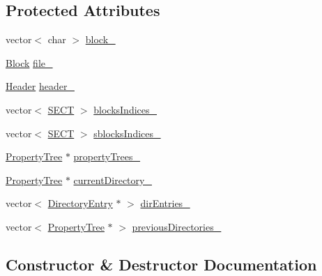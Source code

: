 \subsection*{Protected Attributes}
\begin{DoxyCompactItemize}
\item 
vector$<$ char $>$ \hyperlink{class_y_compound_files_1_1_compound_file_a3ccb0296e57bcafe657ca02f08cdb3d0}{block\+\_\+}
\item 
\hyperlink{class_y_compound_files_1_1_block}{Block} \hyperlink{class_y_compound_files_1_1_compound_file_abd8a8940e9503857dc8e3ab109e9d18b}{file\+\_\+}
\item 
\hyperlink{class_y_compound_files_1_1_compound_file_1_1_header}{Header} \hyperlink{class_y_compound_files_1_1_compound_file_a946c7120aa6ccf47c028620e0f275ef8}{header\+\_\+}
\item 
vector$<$ \hyperlink{_basic_excel_8hpp_a784c2e2144ab372c047faeeb0f6a9e6b}{S\+E\+C\+T} $>$ \hyperlink{class_y_compound_files_1_1_compound_file_aee782bf7c83768a4333fcba419415807}{blocks\+Indices\+\_\+}
\item 
vector$<$ \hyperlink{_basic_excel_8hpp_a784c2e2144ab372c047faeeb0f6a9e6b}{S\+E\+C\+T} $>$ \hyperlink{class_y_compound_files_1_1_compound_file_a772ab9d0acb2963d17f5d33ddb2bc3dc}{sblocks\+Indices\+\_\+}
\item 
\hyperlink{class_y_compound_files_1_1_compound_file_1_1_property_tree}{Property\+Tree} $\ast$ \hyperlink{class_y_compound_files_1_1_compound_file_a79debb22852a2e6b16c94b51d2a00df7}{property\+Trees\+\_\+}
\item 
\hyperlink{class_y_compound_files_1_1_compound_file_1_1_property_tree}{Property\+Tree} $\ast$ \hyperlink{class_y_compound_files_1_1_compound_file_a5f65e3d2af4ef51990e7e61a625c7384}{current\+Directory\+\_\+}
\item 
vector$<$ \hyperlink{class_y_compound_files_1_1_compound_file_1_1_directory_entry}{Directory\+Entry} $\ast$ $>$ \hyperlink{class_y_compound_files_1_1_compound_file_a76e8a502392f10094c547c563d0d4a21}{dir\+Entries\+\_\+}
\item 
vector$<$ \hyperlink{class_y_compound_files_1_1_compound_file_1_1_property_tree}{Property\+Tree} $\ast$ $>$ \hyperlink{class_y_compound_files_1_1_compound_file_a92ceca9cbadff5ef76f39993ae6da46b}{previous\+Directories\+\_\+}
\end{DoxyCompactItemize}


\subsection{Constructor \& Destructor Documentation}
\hypertarget{class_y_compound_files_1_1_compound_file_af4b6835e9949d08d62dab4414fb80c72}{}

